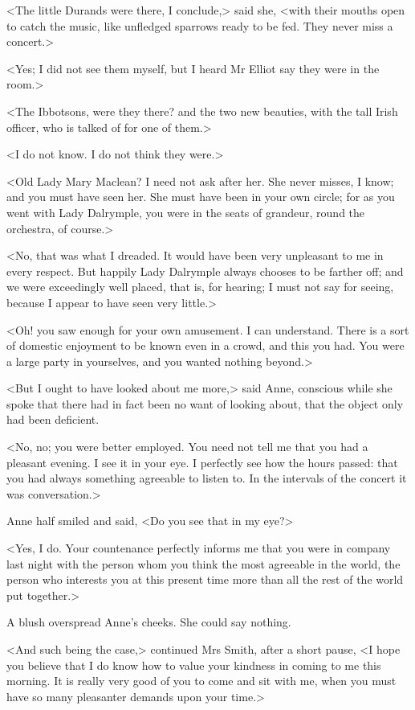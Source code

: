 <The little Durands were there, I conclude,> said she, <with their mouths open to catch the music, like unfledged sparrows ready to be fed. They never miss a concert.>

<Yes; I did not see them myself, but I heard Mr Elliot say they were in the room.>

<The Ibbotsons, were they there? and the two new beauties, with the tall Irish officer, who is talked of for one of them.>

<I do not know. I do not think they were.>

<Old Lady Mary Maclean? I need not ask after her. She never misses, I know; and you must have seen her. She must have been in your own circle; for as you went with Lady Dalrymple, you were in the seats of grandeur, round the orchestra, of course.>

<No, that was what I dreaded. It would have been very unpleasant to me in every respect. But happily Lady Dalrymple always chooses to be farther off; and we were exceedingly well placed, that is, for hearing; I must not say for seeing, because I appear to have seen very little.>

<Oh! you saw enough for your own amusement. I can understand. There is a sort of domestic enjoyment to be known even in a crowd, and this you had. You were a large party in yourselves, and you wanted nothing beyond.>

<But I ought to have looked about me more,> said Anne, conscious while she spoke that there had in fact been no want of looking about, that the object only had been deficient.

<No, no; you were better employed. You need not tell me that you had a pleasant evening. I see it in your eye. I perfectly see how the hours passed: that you had always something agreeable to listen to. In the intervals of the concert it was conversation.>

Anne half smiled and said, <Do you see that in my eye?>

<Yes, I do. Your countenance perfectly informs me that you were in company last night with the person whom you think the most agreeable in the world, the person who interests you at this present time more than all the rest of the world put together.>

A blush overspread Anne's cheeks. She could say nothing.

<And such being the case,> continued Mrs Smith, after a short pause, <I hope you believe that I do know how to value your kindness in coming to me this morning. It is really very good of you to come and sit with me, when you must have so many pleasanter demands upon your time.>


